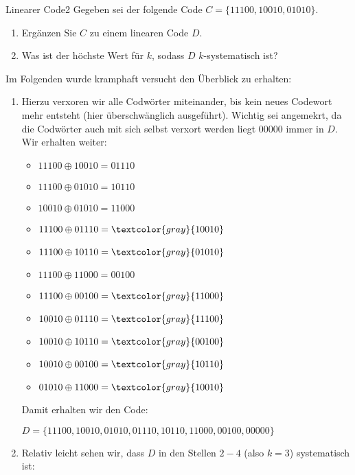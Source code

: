 \begin{aufgabe}{Linearer Code}{2}
    Gegeben sei der folgende Code $C=\{11100, 10010, 01010\}$.
    \begin{enumerate}[label=\alph*)]
        \item Ergänzen Sie $C$ zu einem linearen Code $D$.
        \item Was ist der höchste Wert für $k$, sodass $D$ $k$-systematisch ist?
    \end{enumerate}
\Splitter
Im Folgenden wurde kramphaft versucht den Überblick zu erhalten:\smallskip
\begin{enumerate}[label=\alph*)]
    \item Hierzu verxoren wir alle Codwörter miteinander, bis kein neues Codewort mehr entsteht (hier überschwänglich ausgeführt). Wichtig sei angemekrt, da die Codwörter auch mit sich selbst verxort werden liegt $00000$ immer in $D$. Wir erhalten weiter:
    \begin{multicols}{2}
        \begin{itemize}[label=]\narrowitems
            \item \(11100 \oplus 10010 = 01110\)
            \item \(11100 \oplus 01010 = 10110\)
            \item \(10010 \oplus 01010 = 11000\)
            \item \(11100 \oplus 01110 = \textcolor{gray}{10010}\)
            \item \(11100 \oplus 10110 = \textcolor{gray}{01010}\)
            \item \(11100 \oplus 11000 = 00100\)
            \item \(11100 \oplus 00100 = \textcolor{gray}{11000}\)
            \item \(10010 \oplus 01110 = \textcolor{gray}{11100}\)
            \item \(10010 \oplus 10110 = \textcolor{gray}{00100}\)
            \item \(10010 \oplus 00100 = \textcolor{gray}{10110}\)
            \item \(01010 \oplus 11000 = \textcolor{gray}{10010}\)
        \end{itemize}
    \end{multicols}
    Damit erhalten wir den Code:\begin{centered}
        $D = \{11100,10010, 01010, 01110,10110,11000,00100,00000\}$
    \end{centered}
    \item Relativ leicht sehen wir, dass $D$ in den Stellen $2-4$ (also $k = 3$) systematisch ist:     

\end{enumerate}
\end{aufgabe}
